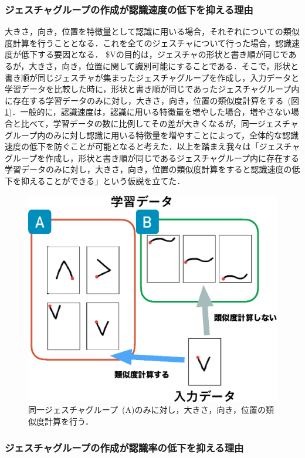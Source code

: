 \subsubsection{ジェスチャグループの作成が認識速度の低下を抑える理由}

大きさ，向き，位置を特徴量として認識に用いる場合，それぞれについての類似度計算を行うこととなる．これを全てのジェスチャについて行った場合，認識速度が低下する要因となる．
\$Vの目的は，ジェスチャの形状と書き順が同じであるが，大きさ，向き，位置に関して識別可能にすることである．そこで，形状と書き順が同じジェスチャが集まったジェスチャグループを作成し，入力データと学習データを比較した時に，形状と書き順が同じであったジェスチャグループ内に存在する学習データのみに対し，大きさ，向き，位置の類似度計算をする~(図\ref{fig:speed_reason})．一般的に，認識速度は，認識に用いる特徴量を増やした場合，増やさない場合と比べて，学習データの数に比例してその差が大きくなるが，同一ジェスチャグループ内のみに対し認識に用いる特徴量を増やすことによって，全体的な認識速度の低下を防ぐことが可能となると考えた．以上を踏まえ我々は「ジェスチャグループを作成し，形状と書き順が同じであるジェスチャグループ内に存在する学習データのみに対し，大きさ，向き，位置の類似度計算をすると認識速度の低下を抑えることができる」という仮説を立てた．

\begin{figure} [h!]
	\begin{center}
		\includegraphics [width=0.6\hsize ]{img/speed_reason.eps}
	\end{center}
	\caption{同一ジェスチャグループ~(A)のみに対し，大きさ，向き，位置の類似度計算を行う．}
	\label{fig:speed_reason}
\end{figure}

\subsubsection{ジェスチャグループの作成が認識率の低下を抑える理由}

